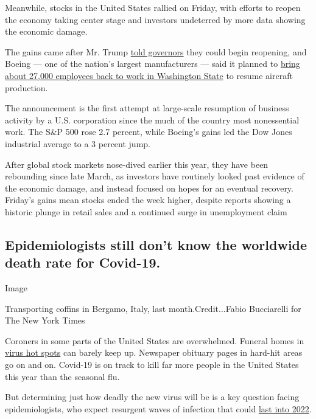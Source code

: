 Meanwhile, stocks in the United States rallied on Friday, with efforts
to reopen the economy taking center stage and investors undeterred by
more data showing the economic damage.

The gains came after Mr. Trump
\href{https://www.nytimes3xbfgragh.onion/2020/04/16/us/politics/coronavirus-trump-guidelines.html}{told
governors} they could begin reopening, and Boeing --- one of the
nation's largest manufacturers --- said it planned to
\href{https://www.nytimes3xbfgragh.onion/2020/04/16/business/boeing-restart-production-coronavirus.html}{bring
about 27,000 employees back to work in Washington State} to resume
aircraft production.

The announcement is the first attempt at large-scale resumption of
business activity by a U.S. corporation since the much of the country
most nonessential work. The S\&P 500 rose 2.7 percent, while Boeing's
gains led the Dow Jones industrial average to a 3 percent jump.

After global stock markets nose-dived earlier this year, they have been
rebounding since late March, as investors have routinely looked past
evidence of the economic damage, and instead focused on hopes for an
eventual recovery. Friday's gains mean stocks ended the week higher,
despite reports showing a historic plunge in retail sales and a
continued surge in unemployment claim

\hypertarget{epidemiologists-still-dont-know-the-worldwide-death-rate-for-covid-19}{%
\subsection{Epidemiologists still don't know the worldwide death rate
for
Covid-19.}\label{epidemiologists-still-dont-know-the-worldwide-death-rate-for-covid-19}}

Image

Transporting coffins in Bergamo, Italy, last month.Credit...Fabio
Bucciarelli for The New York Times

Coroners in some parts of the United States are overwhelmed. Funeral
homes in
\href{https://www.nytimes3xbfgragh.onion/2020/04/17/podcasts/the-daily/alexandria-ocasio-cortez-coronavirus.html}{virus
hot spots} can barely keep up. Newspaper obituary pages in hard-hit
areas go on and on. Covid-19 is on track to kill far more people in the
United States this year than the seasonal flu.

But determining just how deadly the new virus will be is a key question
facing epidemiologists, who expect resurgent waves of infection that
could
\href{https://science.sciencemag.org/content/early/2020/04/14/science.abb5793}{last
into 2022}.

